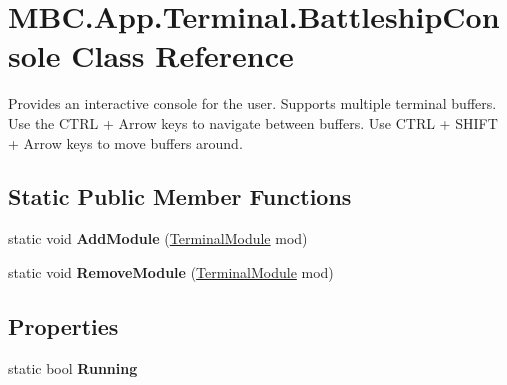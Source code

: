 \hypertarget{class_m_b_c_1_1_app_1_1_terminal_1_1_battleship_console}{\section{M\-B\-C.\-App.\-Terminal.\-Battleship\-Console Class Reference}
\label{class_m_b_c_1_1_app_1_1_terminal_1_1_battleship_console}
}


Provides an interactive console for the user. Supports multiple terminal buffers. Use the C\-T\-R\-L + Arrow keys to navigate between buffers. Use C\-T\-R\-L + S\-H\-I\-F\-T + Arrow keys to move buffers around. 


\subsection*{Static Public Member Functions}
\begin{DoxyCompactItemize}
\item 
\hypertarget{class_m_b_c_1_1_app_1_1_terminal_1_1_battleship_console_a8f7f39ffe8ab6972e283ab2f034c0d7f}{static void {\bfseries Add\-Module} (\hyperlink{class_m_b_c_1_1_app_1_1_terminal_1_1_terminal_module}{Terminal\-Module} mod)}\label{class_m_b_c_1_1_app_1_1_terminal_1_1_battleship_console_a8f7f39ffe8ab6972e283ab2f034c0d7f}

\item 
\hypertarget{class_m_b_c_1_1_app_1_1_terminal_1_1_battleship_console_a77de210e288a093409e51a6420699778}{static void {\bfseries Remove\-Module} (\hyperlink{class_m_b_c_1_1_app_1_1_terminal_1_1_terminal_module}{Terminal\-Module} mod)}\label{class_m_b_c_1_1_app_1_1_terminal_1_1_battleship_console_a77de210e288a093409e51a6420699778}

\end{DoxyCompactItemize}
\subsection*{Properties}
\begin{DoxyCompactItemize}
\item 
\hypertarget{class_m_b_c_1_1_app_1_1_terminal_1_1_battleship_console_a9315288f6855e9f29b87e38232ef6b71}{static bool {\bfseries Running}}\label{class_m_b_c_1_1_app_1_1_terminal_1_1_battleship_console_a9315288f6855e9f29b87e38232ef6b71}

\end{DoxyCompactItemize}


